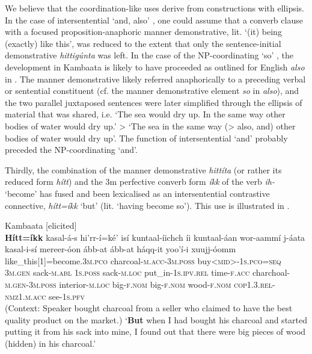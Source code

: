\documentclass[output=paper,colorlinks,citecolor=brown]{langscibook}
\begin{document}
We believe that the coordination-like uses derive from constructions with ellipsis. In the case of intersentential ‘and, also’ , one could assume that a converb clause with a focused proposition-anaphoric manner demonstrative, lit. ‘(it) being (exactly) like this’, was reduced to the extent that only the sentence-initial demonstrative \textit{hittigúnta} was left. In the case of the NP-coordinating ‘so’ , the development in Kambaata is likely to have proceeded as outlined for English \textit{also} in \citet[44f]{König2015}. The manner demonstrative likely referred anaphorically to a preceding verbal or sentential constituent (cf. the manner demonstrative element \textit{so} in \textit{also}), and the two parallel juxtaposed sentences were later simplified through the ellipsis of material that was shared, i.e. ‘The sea would dry up. In the same way other bodies of water would dry up.’ > ‘The sea in the same way (> also, and) other bodies of water would dry up’. The function of intersentential ‘and’ probably preceded the NP-coordinating ‘and’.

Thirdly, the combination of the manner demonstrative \textit{hittíta} (or rather its reduced form \textit{hítt}) and the 3m perfective converb form \textit{íkk} of the verb \textit{ih-} ‘become’ has fused and been lexicalised as an intersentential contrastive connective, \textit{hítt=íkk} ‘but’ (lit. ‘having become so’). This use is illustrated in .

\ea\label{ex:nikitina:16} {Kambaata [elicited]}\\
\gll \textbf{Hítt=íkk} kasal-á-s hi’rr-í=ké’ isí kuntaal-íichch íi kuntaal-áan wor-aammí j-áata kasal-i-sí mereer-óon ább-at ább-at háqq-it yoo’í-i xuujj-óomm\\
     like\_this[1]=become.\textsc{3m.pco} charcoal-\textsc{m.acc}{}-\textsc{3m.poss} buy<\textsc{mid}>-\textsc{1s.pco}=\textsc{seq} \textsc{3m.gen} sack-\textsc{m.abl} \textsc{1s.poss} sack-\textsc{m.loc} put\_in-\textsc{1s.ipv.rel} time-\textsc{f.acc} charchoal-\textsc{m.gen}{}-\textsc{3m.poss} interior-\textsc{m.loc} big-\textsc{f.nom} big-\textsc{f.nom} wood-\textsc{f.nom} \textsc{cop1.3.rel-nmz1.m.acc} see-\textsc{1s.pfv}\\
\glt (Context: Speaker bought charcoal from a seller who claimed to have the best quality product on the market.) ‘\textbf{But} when I had bought his charcoal and started putting it from his sack into mine, I found out that there were big pieces of wood (hidden) in his charcoal.’
\z
\end{document}
